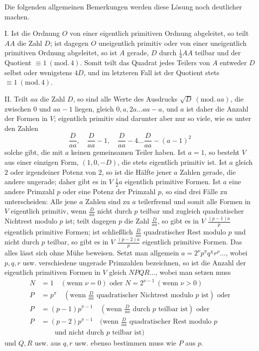 Die folgenden allgemeinen Bemerkungen werden diese Lösung noch deutlicher machen.

I. Ist die Ordnung \(O\) von einer eigentlich primitiven Ordnung abgeleitet, so teilt \(AA\) die Zahl \(D\); ist dagegen \(O\) uneigentlich primitiv oder von einer uneigentlich primitiven Ordnung abgeleitet, so ist \(A\) gerade, \(D\) durch \(\frac14 AA\) teilbar und der Quotient \(\equiv1\ (\mathrm{mod.}\,4)\). Somit teilt das Quadrat jedes Teilers von \(A\) entweder \(D\) selbst oder wenigstens \(4D\), und im letzteren Fall ist der Quotient stets \(\equiv1\ (\mathrm{mod.}\,4)\).

II. Teilt \(aa\) die Zahl \(D\), so sind alle Werte des Ausdrucks \(\surd D\ (\mathrm{mod.}\,aa)\), die zwischen \(0\) und \(aa-1\) liegen, gleich \(0,a,2a\ldots aa-a\), und \(a\) ist daher die Anzahl der Formen in \(V\); eigentlich primitiv sind darunter aber nur so viele, wie es unter den Zahlen
\[
\frac{D}{aa},\quad\frac{D}{aa}-1,\quad\frac{D}{aa}-4\ldots\frac{D}{aa}-(a-1)^2
\]
solche gibt, die mit \(a\) keinen gemeinsamen Teiler haben. Ist \(a=1\), so besteht \(V\) aus einer einzigen Form, \((1,0,-D)\), die stets eigentlich primitiv ist. Ist \(a\) gleich \(2\) oder irgendeiner Potenz von \(2\), so ist die Hälfte jener \(a\) Zahlen gerade, die andere ungerade; daher gibt es in \(V\) \(\frac12 a\) eigentlich primitive Formen. Ist \(a\) eine andere Primzahl \(p\) oder eine Potenz der Primzahl \(p\), so sind drei Fälle zu unterscheiden: Alle jene \(a\) Zahlen sind zu \(a\) teilerfremd und somit alle Formen in \(V\) eigentlich primitiv, wenn \(\frac{D}{aa}\) nicht durch \(p\) teilbar und zugleich quadratischer Nichtrest modulo \(p\) ist; teilt dagegen \(p\) die Zahl \(\frac{D}{aa}\), so gibt es in \(V\) \(\frac{(p-1)a}{p}\) eigentlich primitive Formen; ist schließlich \(\frac{D}{aa}\) quadratischer Rest modulo \(p\) und nicht durch \(p\) teilbar, so gibt es in \(V\) \(\frac{(p-2)a}{p}\) eigentlich primitive Formen. Das alles lässt sich ohne Mühe beweisen. Setzt man allgemein \(a=2^\nu p^\pi q^\chi r^\rho\ldots\), wobei \(p,q,r\) usw. verschiedene ungerade Primzahlen bezeichnen, so ist die Anzahl der eigentlich primitiven Formen in \(V\) gleich \(NPQR\ldots\), wobei man setzen muss
\[
\begin{aligned}
N&=1\quad(\text{wenn }\nu=0)\text{ oder }N=2^{\nu-1}\ (\text{wenn }\nu>0)\\
P&=p^\pi\quad(\text{wenn }\tfrac{D}{aa}\text{ quadratischer Nichtrest modulo }p\text{ ist})\text{ oder}\\
P&=(p-1)p^{\pi-1}\quad(\text{wenn }\tfrac{D}{aa}\text{ durch }p\text{ teilbar ist})\text{ oder}\\
P&=(p-2)p^{\pi-1}\quad(\text{wenn }\tfrac{D}{aa}\text{ quadratischer Rest modulo }p\\ &\qquad\text{und nicht durch }p\text{ teilbar ist})
\end{aligned}
\]
und \(Q,R\) usw. aus \(q,r\) usw. ebenso bestimmen muss wie \(P\) aus \(p\).

